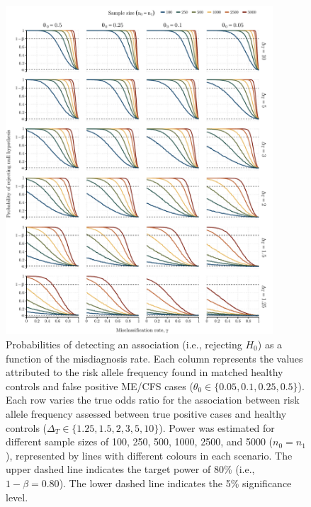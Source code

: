 \begin{figure}
    \centering\includegraphics[width=0.89\textwidth,height=\textheight,keepaspectratio]{chapter/2023-misdiagnosis/figures/fig1-simulations-candidate-gene.pdf}
    \caption[Probabilities of detecting an association as a function of the misdiagnosis rate]{Probabilities of detecting an association (i.e., rejecting $H_0$) as a function of the misdiagnosis rate. Each column represents the values attributed to the risk allele frequency found in matched healthy controls and false positive ME/CFS cases ($\theta_0 \in \{0.05,0.1,0.25,0.5\}$). Each row varies the true odds ratio for the association between risk allele frequency assessed between true positive cases and healthy controls ($\Delta_T \in \{1.25,1.5,2,3,5,10\}$). Power was estimated for different sample sizes of 100, 250, 500, 1000, 2500, and 5000 ($n_0 = n_1$), represented by lines with different colours in each scenario. The upper dashed line indicates the target power of 80\% (i.e., $1-\beta=0.80$). The lower dashed line indicates the 5\% significance level.}
    \label{fig:resultscandidategene}
\end{figure}

